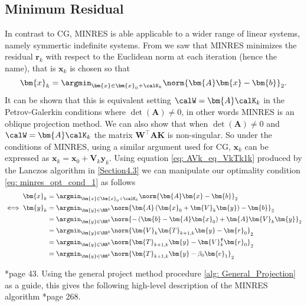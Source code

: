 \subsection{Minimum Residual}\label{Section4.6}
In contrast to CG, MINRES is able applicable to a wider range of linear systems, namely symmertic indefinite systems. From  we saw that MINRES minimizes the residual $\bm{r}_k$ with respect to the Euclidean norm at each iteration (hence the name), that is $\bm{x}_k$ is chosen so that
\begin{equation} \label{eq: minres_opt_cond_1}
    \bm{x}_k = \argmin_{\bm{x} \in \bm{x}_0 + \calK_k} \norm{\bm{A} \bm {x} - \bm{b}}_2.
\end{equation}
It can be shown that this is equivalent setting $\calW = \bm{A} \calK_k$ in the Petrov-Galerkin conditions where $\det \left( \bm{A} \right) \neq 0$, in other words MINRES is an oblique projection method. We can also show that when $\det \left( \bm{A} \right) \neq 0$ and $\calW = \bm{A} \calK_k$ the matrix $\bm{W}^{\intercal} \bm{A} \bm{K}$ is non-singular. So under the conditions of MINRES, using a similar argument used for CG, $\bm{x}_k$ can be expressed as $\bm{x}_k = \bm{x}_0 + \bm{V}_k \bm{y}_k$. Using equation \ref{eq: AVk_eq_VkTk1k} produced by the Lanczos algorithm in \ref{Section4.3} we can manipulate our optimality condition \ref{eq: minres_opt_cond_1} as follows
\begin{align*}
    \bm{x}_k      & = \argmin_{\bm{x} \in \bm{x}_0 + \calK_k} \norm{\bm{A} \bm {x} - \bm{b}}_2                                 \\
    \iff \bm{y}_k & = \argmin_{\bm{y} \in \RR^k} \norm{\bm{A} \left( \bm{x}_0 + \bm{V}_k \bm{y} \right) - \bm{b}}_2            \\
                  & = \argmin_{\bm{y} \in \RR^k} \norm{ - \left( \bm{b} - \bm{A} \bm{x}_0 \right) + \bm{A} \bm{V}_k \bm{y} }_2 \\
                  & = \argmin_{\bm{y} \in \RR^k} \norm{ \bm{V}_{k} \bm{T}_{k+1,k} \bm{y} - \bm{r}_0 }_2                        \\
                  & = \argmin_{\bm{y} \in \RR^k} \norm{ \bm{T}_{k+1,k} \bm{y} - \bm{V}_{k}^{\intercal} \bm{r}_0 }_2            \\
                  & = \argmin_{\bm{y} \in \RR^k} \norm{ \bm{T}_{k+1,k} \bm{y} - \beta_0 \bm{e}_1 }_2
\end{align*}

\cite{GreenbaumAnne1997Imfs}*{page 43}. Using the general project method procedure \ref{alg: General_Projection} as a guide, this gives the following high-level description of the MINRES algorithm \cite{TrefethenLloydN.LloydNicholas1997Nla/}*{page 268}.

